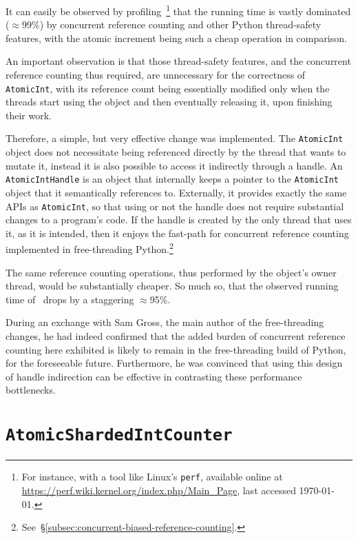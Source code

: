 It can easily be observed by profiling~\cite[examples/atomic\_int/counter.py]{cereggii}\footnote{%
    For instance, with a tool like Linux's \texttt{perf}, available online at \url{https://perf.wiki.kernel.org/index.php/Main_Page}, last accessed \today.
} that the running time is vastly dominated ($\approx$99\%) by concurrent reference counting and other Python thread-safety features, with the atomic increment being such a cheap operation in comparison.

An important observation is that those thread-safety features, and the concurrent reference counting thus required, are unnecessary for the correctness of \texttt{AtomicInt}, with its reference count being essentially modified only when the threads start using the object and then eventually releasing it, upon finishing their work.

Therefore, a simple, but very effective change was implemented.
The \texttt{AtomicInt} object does not necessitate being referenced directly by the thread that wants to mutate it, instead it is also possible to access it indirectly through a handle.
An \texttt{AtomicIntHandle} is an object that internally keeps a pointer to the \texttt{AtomicInt} object that it semantically references to.
Externally, it provides exactly the same APIs as \texttt{AtomicInt}, so that using or not the handle does not require substantial changes to a program's code.
If the handle is created by the only thread that uses it, as it is intended, then it enjoys the fast-path for concurrent reference counting implemented in free-threading Python.\footnote{%
    See~\S\ref{subsec:concurrent-biased-reference-counting}.
}

The same reference counting operations, thus performed by the object's owner thread, would be substantially cheaper.
So much so, that the observed running time of~\cite[examples/atomic\_int/counter.py]{cereggii} drops by a staggering $\approx$95\%.

During an exchange with Sam Gross, the main author of the free-threading changes, he had indeed confirmed that the added burden of concurrent reference counting here exhibited is likely to remain in the free-threading build of Python, for the foreseeable future.
Furthermore, he was convinced that using this design of handle indirection can be effective in contrasting these performance bottlenecks.


\section{\texttt{AtomicShardedIntCounter}}\label{sec:atomicshardedintcounter}

